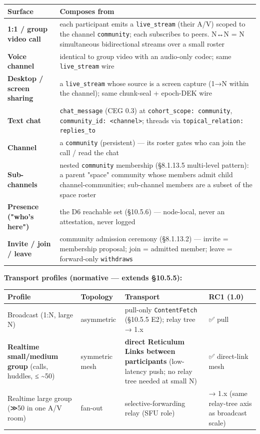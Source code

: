 \documentclass[10pt]{article}
\begin{document}
{\footnotesize
\begin{longtable}{|p{8.0cm}|p{8.0cm}|}\hline
\textbf{Surface} & \textbf{Composes from} \\ \hline\endhead
\textbf{1:1 / group video call} & each participant emits a \texttt{live\_stream} (their A/V) scoped to the channel \texttt{community}; each subscribes to peers. N↔N = N simultaneous bidirectional streams over a small roster \\ \hline
\textbf{Voice channel} & identical to group video with an audio-only codec; same \texttt{live\_stream} wire \\ \hline
\textbf{Desktop / screen sharing} & a \texttt{live\_stream} whose source is a screen capture (1→N within the channel); same chunk-seal + epoch-DEK wire \\ \hline
\textbf{Text chat} & \texttt{chat\_message} (CEG 0.3) at \texttt{cohort\_scope: community}, \texttt{community\_id: <channel>}; threads via \texttt{topical\_relation: replies\_to} \\ \hline
\textbf{Channel} & a \texttt{community} (persistent) — its roster gates who can join the call / read the chat \\ \hline
\textbf{Sub-channels} & nested \texttt{community} membership (§8.1.13.5 multi-level pattern): a parent "space" community whose members admit child channel-communities; sub-channel members are a subset of the space roster \\ \hline
\textbf{Presence ("who's here")} & the D6 reachable set (§10.5.6) — node-local, never an attestation, never logged \\ \hline
\textbf{Invite / join / leave} & community admission ceremony (§8.1.13.2) — invite = membership proposal; join = admitted member; leave = forward-only \texttt{withdraws} \\ \hline
\end{longtable}}


\textbf{Transport profiles (normative — extends §10.5.5):}


{\scriptsize
\begin{longtable}{|p{4.0cm}|p{4.0cm}|p{4.0cm}|p{4.0cm}|}\hline
\textbf{Profile} & \textbf{Topology} & \textbf{Transport} & \textbf{RC1 (1.0)} \\ \hline\endhead
Broadcast (1:N, large N) & asymmetric & pull-only \texttt{ContentFetch} (§10.5.5 E2); relay tree → 1.x & ✅ pull \\ \hline
\textbf{Realtime small/medium group} (calls, huddles, ≤ \textasciitilde{}50) & symmetric mesh & \textbf{direct Reticulum Links between participants} (low-latency push; no relay tree needed at small N) & ✅ direct-link mesh \\ \hline
Realtime large group (≫50 in one A/V room) & fan-out & selective-forwarding relay (SFU role) & → 1.x (same relay-tree axis as broadcast scale) \\ \hline
\end{longtable}}
\end{document}
